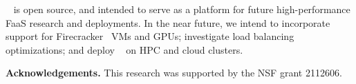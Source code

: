 \sysname~ is open source, and intended to serve as a platform for future high-performance FaaS research and deployments.
In the near future, we intend to incorporate support for  Firecracker~\cite{firecracker-nsdi20}  VMs and GPUs; investigate load balancing optimizations; and deploy \sysname~ on HPC and cloud clusters. 

\noindent \textbf{Acknowledgements.}
This research was supported by the NSF grant 2112606. 

